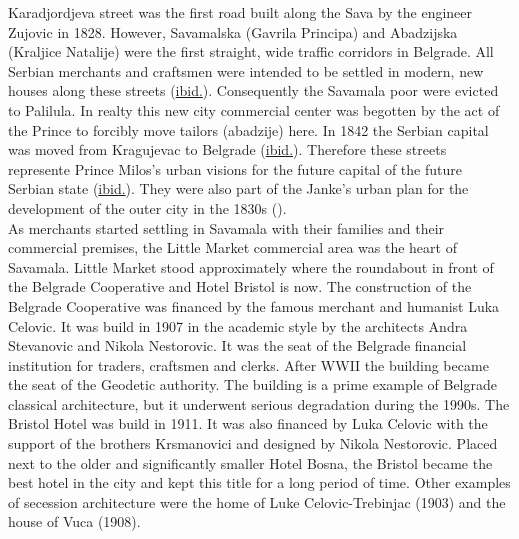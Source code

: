 \documentclass[11pt]{report}
\begin{document}
{{{{Karadjordjeva street was the first road built along the Sava by the engineer Zujovic in 1828. However, Savamalska (Gavrila Principa) and Abadzijska (Kraljice Natalije) were the first straight, wide traffic corridors in Belgrade. All Serbian merchants and craftsmen were intended to be settled in modern, new houses along these streets (\href{Doytchinov}{ibid.}).
Consequently the Savamala poor were evicted to Palilula. 
In realty this new city commercial center was begotten by the act of the Prince to forcibly move tailors (abadzije) here.
In 1842 the Serbian capital was moved from Kragujevac to Belgrade (\href{ref}{ibid.}).
Therefore these streets represente Prince Milos’s urban visions for the future capital of the future Serbian state (\href{ref}{ibid.}).
They were also part of the Janke's urban plan for the development of the outer city in the 1830s  (\href{Blagojevic}{\citealt{blagojevic_urban_2009}}). 
\\

As merchants started settling in Savamala with their families and their commercial premises, the Little Market commercial area was the heart of Savamala. Little Market stood approximately where the roundabout in front of the Belgrade Cooperative and Hotel Bristol is now. The construction of the Belgrade Cooperative was financed by the famous merchant and humanist Luka Celovic. It was build in 1907 in the academic style by the architects Andra Stevanovic and Nikola Nestorovic. It was the seat of the Belgrade financial institution for traders, craftsmen and clerks. After WWII the building became the seat of the Geodetic authority. The building is a prime example of Belgrade classical architecture, but it underwent serious degradation during the 1990s.  The Bristol Hotel was build in 1911. It was also financed by Luka Celovic with the support of the brothers Krsmanovici and designed by Nikola Nestorovic. Placed next to the older and significantly smaller Hotel Bosna, the Bristol became the best hotel in the city and kept this title for a long period of time. Other examples of secession architecture were the home of Luke Celovic-Trebinjac (1903) and the house of Vuca (1908).
\\

}}}}
\end{document}

